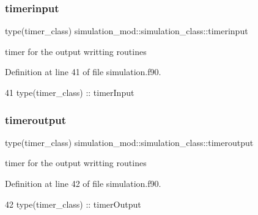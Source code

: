 \subsubsection{\texorpdfstring{timerinput}{timerinput}}
{\footnotesize\ttfamily type(timer\+\_\+class) simulation\+\_\+mod\+::simulation\+\_\+class\+::timerinput\hspace{0.3cm}{\ttfamily [private]}}



timer for the output writting routines 



Definition at line 41 of file simulation.\+f90.


\begin{DoxyCode}
41         \textcolor{keywordtype}{type}(timer\_class) :: timerInput
\end{DoxyCode}
\mbox{\label{structsimulation__mod_1_1simulation__class_a8273da2899310646a161fedc96434bf9}} 
\subsubsection{\texorpdfstring{timeroutput}{timeroutput}}
{\footnotesize\ttfamily type(timer\+\_\+class) simulation\+\_\+mod\+::simulation\+\_\+class\+::timeroutput\hspace{0.3cm}{\ttfamily [private]}}



timer for the output writting routines 



Definition at line 42 of file simulation.\+f90.


\begin{DoxyCode}
42         \textcolor{keywordtype}{type}(timer\_class) :: timerOutput
\end{DoxyCode}
\mbox{\label{structsimulation__mod_1_1simulation__class_ac759ee5fda4ddfb16deeb833c59709e3}} 

